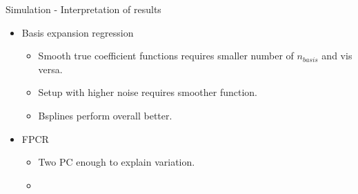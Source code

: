 \documentclass{beamer}
\begin{document}
	\begin{frame}{Simulation - Interpretation of results}
		\begin{itemize}
		\item Basis expansion regression
			\begin{itemize}
    			\item Smooth true coefficient functions requires smaller number of $n_{basis}$ and vis versa.
    			\item Setup with higher noise requires smoother function.
    			\item Bsplines perform overall better.
		\end{itemize}
    		\item FPCR
    			\begin{itemize}
    				\item Two PC enough to explain variation.
    				\item 
    			\end{itemize}
    		
		
		\end{itemize}
	\end{frame}
	
	
	
\end{document}
